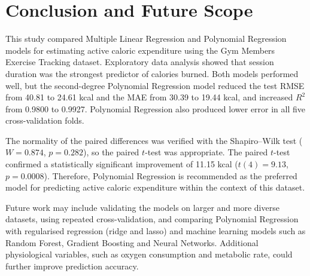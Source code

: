 \documentclass[12pt,a4paper]{report}
\begin{document}
\chapter{Conclusion and Future Scope}
This study compared Multiple Linear Regression and Polynomial Regression models for estimating active caloric expenditure using the Gym Members Exercise Tracking dataset. Exploratory data analysis showed that session duration was the strongest predictor of calories burned. Both models performed well, but the second-degree Polynomial Regression model reduced the test RMSE from 40.81 to 24.61 kcal and the MAE from 30.39 to 19.44 kcal, and increased $R^2$ from 0.9800 to 0.9927. Polynomial Regression also produced lower error in all five cross-validation folds.

The normality of the paired differences was verified with the Shapiro--Wilk test ($W = 0.874$, $p = 0.282$), so the paired $t$-test was appropriate. The paired $t$-test confirmed a statistically significant improvement of 11.15 kcal ($t(4) = 9.13$, $p = 0.0008$). Therefore, Polynomial Regression is recommended as the preferred model for predicting active caloric expenditure within the context of this dataset.

Future work may include validating the models on larger and more diverse datasets, using repeated cross-validation, and comparing Polynomial Regression with regularised regression (ridge and lasso) and machine learning models such as Random Forest, Gradient Boosting and Neural Networks. Additional physiological variables, such as oxygen consumption and metabolic rate, could further improve prediction accuracy.
\end{document}
